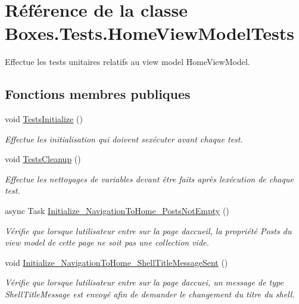 \hypertarget{class_boxes_1_1_tests_1_1_home_view_model_tests}{}\section{Référence de la classe Boxes.\+Tests.\+Home\+View\+Model\+Tests}
\label{class_boxes_1_1_tests_1_1_home_view_model_tests}


Effectue les tests unitaires relatifs au view model Home\+View\+Model.  


\subsection*{Fonctions membres publiques}
\begin{DoxyCompactItemize}
\item 
void \hyperlink{class_boxes_1_1_tests_1_1_home_view_model_tests_a9961c9ccfb49e506ee4c3e9f625386e1}{Tests\+Initialize} ()
\begin{DoxyCompactList}\small\item\em Effectue les initialisation qui doivent s\textquotesingle{}exécuter avant chaque test. \end{DoxyCompactList}\item 
void \hyperlink{class_boxes_1_1_tests_1_1_home_view_model_tests_a2b014e6e0e790f691c0bf6e939e6ad34}{Tests\+Cleanup} ()
\begin{DoxyCompactList}\small\item\em Effectue les nettoyages de variables devant être faits après l\textquotesingle{}exécution de chaque test. \end{DoxyCompactList}\item 
async Task \hyperlink{class_boxes_1_1_tests_1_1_home_view_model_tests_a4a49b19e1b9bd1feb12cf22e22fcfe63}{Initialize\+\_\+\+Navigation\+To\+Home\+\_\+\+Posts\+Not\+Empty} ()
\begin{DoxyCompactList}\small\item\em Vérifie que lorsque l\textquotesingle{}utilisateur entre sur la page d\textquotesingle{}accueil, la propriété {\ttfamily Posts} du view model de cette page ne soit pas une collection vide. \end{DoxyCompactList}\item 
void \hyperlink{class_boxes_1_1_tests_1_1_home_view_model_tests_aa687cb2dc81e032dd75c74e7b59fc549}{Initialize\+\_\+\+Navigation\+To\+Home\+\_\+\+Shell\+Title\+Message\+Sent} ()
\begin{DoxyCompactList}\small\item\em Vérifie que lorsque l\textquotesingle{}utilisateur entre sur la page d\textquotesingle{}accuei, un message de type Shell\+Title\+Message est envoyé afin de demander le changement du titre du shell. \end{DoxyCompactList}\item 

\end{DoxyCompactItemize}
